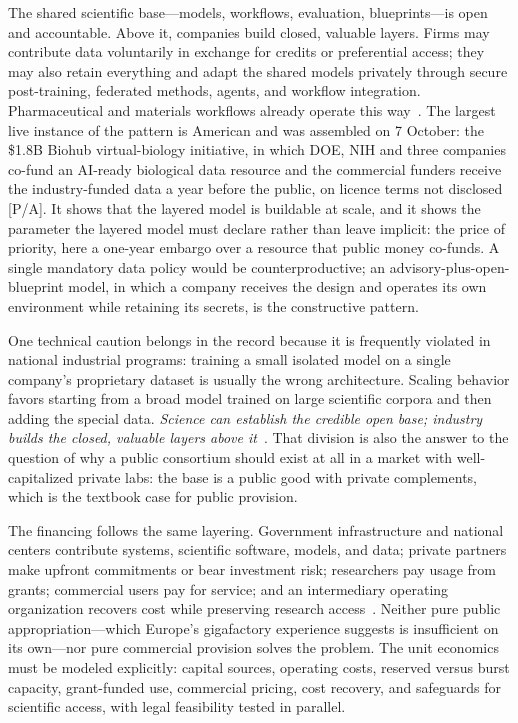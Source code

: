 The shared scientific base---models, workflows, evaluation, blueprints---is open and accountable. Above it, companies build closed, valuable layers. Firms may contribute data voluntarily in exchange for credits or preferential access; they may also retain everything and adapt the shared models privately through secure post-training, federated methods, agents, and workflow integration. Pharmaceutical and materials workflows already operate this way~\cite{consortium-record}. The largest live instance of the pattern is American and was assembled on 7 October: the \$1.8B Biohub virtual-biology initiative, in which DOE, NIH and three companies co-fund an AI-ready biological data resource and the commercial funders receive the industry-funded data a year before the public, on licence terms not disclosed~\cite{sci-biohub,sci-biohub-embargo} [P/A]. It shows that the layered model is buildable at scale, and it shows the parameter the layered model must declare rather than leave implicit: the price of priority, here a one-year embargo over a resource that public money co-funds. A single mandatory data policy would be counterproductive; an advisory-plus-open-blueprint model, in which a company receives the design and operates its own environment while retaining its secrets, is the constructive pattern.

One technical caution belongs in the record because it is frequently violated in national industrial programs: training a small isolated model on a single company's proprietary dataset is usually the wrong architecture. Scaling behavior favors starting from a broad model trained on large scientific corpora and then adding the special data. \emph{Science can establish the credible open base; industry builds the closed, valuable layers above it}~\cite{consortium-record}. That division is also the answer to the question of why a public consortium should exist at all in a market with well-capitalized private labs: the base is a public good with private complements, which is the textbook case for public provision.

The financing follows the same layering. Government infrastructure and national centers contribute systems, scientific software, models, and data; private partners make upfront commitments or bear investment risk; researchers pay usage from grants; commercial users pay for service; and an intermediary operating organization recovers cost while preserving research access~\cite{consortium-record}. Neither pure public appropriation---which Europe's gigafactory experience suggests is insufficient on its own---nor pure commercial provision solves the problem. The unit economics must be modeled explicitly: capital sources, operating costs, reserved versus burst capacity, grant-funded use, commercial pricing, cost recovery, and safeguards for scientific access, with legal feasibility tested in parallel.

